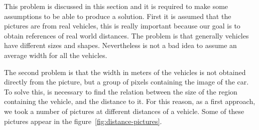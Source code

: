 This problem is discussed in this section and it is required to make some
assumptions to be able to produce a solution. First it is assumed that the
pictures are from real vehicles, this is really
important because our goal is to obtain references of real world distances. The
problem is that generally vehicles have different sizes and shapes. Nevertheless
is not a bad idea to assume an average width for all the vehicles. 

The second problem is that the width in meters of the vehicles is not obtained 
directly from the picture, but a group of pixels containing the image of
the car. To solve this, is necessary to find the relation between the size of
the region containing the vehicle, and the distance to it. For this reason, as a first
approach, we took a number of pictures at different distances of a vehicle. Some of 
these pictures appear in the figure~\ref{fig:distance-pictures}.

